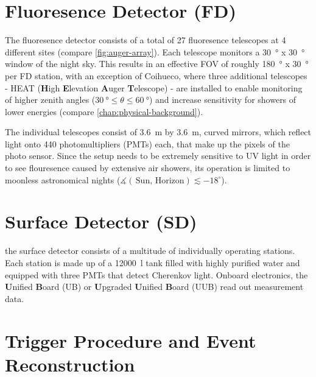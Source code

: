 \section{Fluoresence Detector (FD)}
\label{sec:fluoresence-detector}

The fluoresence detector consists of a total of 27 fluoresence telescopes at 4 different sites (compare \autoref{fig:auger-array}). Each telescope
monitors a \SI{30}{\degree} x \SI{30}{\degree} window of the night sky. This results in an effective FOV of roughly \SI{180}{\degree} x 
\SI{30}{\degree} per FD station, with an exception of Coihueco, where three additional telescopes - HEAT (\textbf{H}igh \textbf{E}levation 
\textbf{A}uger \textbf{T}elescope) - are installed to enable monitoring of higher zenith angles ($\SI{30}{\degree}\leq\theta\leq\SI{60}{\degree}$) and
increase sensitivity for showers of lower energies (compare \autoref{chap:physical-background}).

The individual telescopes consist of \SI{3.6}{\meter} by \SI{3.6}{\meter}, curved mirrors, which reflect light onto 440 photomultipliers (PMTs)
each, that make up the pixels of the photo sensor. Since the setup needs to be extremely sensitive to UV light in order to see flouresence caused by
extensive air showers, its operation is limited to moonless astronomical nights ($\measuredangle(\,\text{Sun},\,\text{Horizon})\lesssim-18^{\circ}$). 


\section{Surface Detector (SD)}
\label{sec:surface-detector}

the surface detector consists of a multitude of individually operating stations. Each station is made up of a \SI{12000}{\litre} tank filled with 
highly purified water and equipped with three PMTs that detect Cherenkov light. Onboard electronics, the \textbf{U}nified \textbf{B}oard (UB) or
\textbf{U}pgraded \textbf{U}nified \textbf{B}oard (UUB) read out measurement data. 

\section{Trigger Procedure and Event Reconstruction}
\label{sec:event-reconstruction}


